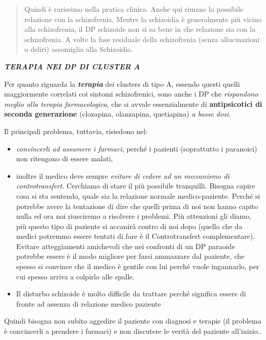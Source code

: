 \documentclass[]{article}
\begin{document}
\begin{quote}
Quindi è rarissimo nella pratica clinica. Anche qui rimane la possibile
relazione con la schizofrenia. Mentre la schizoidia è generalmente più
vicino alla schizofrenia, il DP schizoide non si sa bene in che
relazione sia con la schizofrenia. A volte la fase residuale della
schizofrenia (senza allucinazioni o deliri) assomiglia alla Schizoidia.
\end{quote}

\textbf{\emph{TERAPIA NEI DP DI CLUSTER A}}

Per quanto riguarda la \textbf{\emph{terapia}} dei clusters di tipo A,
essendo questi quelli maggiormente correlati coi sintomi schizofrenici,
sono anche i DP che \emph{rispondono meglio alla terapia farmacologica},
che si avvale essenzialmente di \textbf{antipsicotici di seconda
generazione} (clozapina, olanzapina, quetiapina) \emph{a basse dosi}.

Il principali problema, tuttavia, risiedono nel:

\begin{itemize}
\item
  \emph{convincerli ad assumere i farmaci}, perché i pazienti
  (soprattutto i paranoici) non ritengono di essere malati,
\item
  inoltre il medico deve sempre \emph{evitare di cedere ad un meccanismo
  di controtransfert}. Cerchiamo di stare il più possibile tranquilli.
  Bisogna capire cosa si sta sentendo, quale sia la relazione normale
  medico-paziente. Perché si potrebbe avere la tentazione di dire che
  quelli prima di noi non hanno capito nulla ed ora noi riusciremo a
  risolvere i problemi. Più attenzioni gli diamo, più questo tipo di
  paziente si accanirà contro di noi dopo (quello che da medici potremmo
  essere tentati di fare è il Controtransfert complementare). Evitare
  atteggiamenti amichevoli che nei confronti di un DP paraoide potrebbe
  essere è il modo migliore per farsi ammazzare dal paziente, che spesso
  si convince che il medico è gentile con lui perché vuole ingannarlo,
  per cui spesso arriva a colpirlo alle spalle.
\item
  Il disturbo schizoide è molto difficile da trattare perché significa
  essere di fronte ad assenza di relazione medico paziente
\end{itemize}

Quindi bisogna non subito aggedire il paziente con diagnosi e terapie
(il problema è convincerli a prendere i farmaci) e non discutere le
verità del paziente all'inizio..
\end{document}
